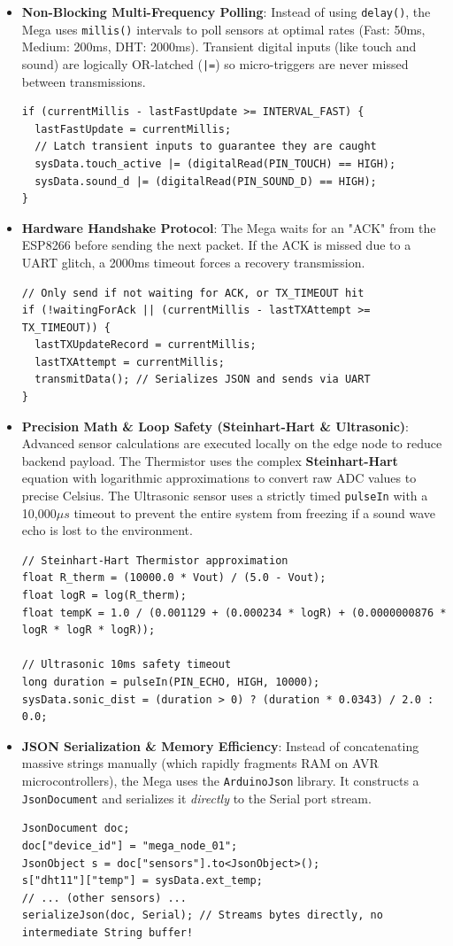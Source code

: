 \documentclass[12pt,a4paper]{article}
\newcommand{\keyword}[1]{\textcolor{keywordcolor}{\textbf{#1}}}
\newcommand{\Q}[1]{\textcolor{questioncolor}{\textbf{#1}}}
\begin{document}
\begin{itemize}
    \item \Q{Non-Blocking Multi-Frequency Polling}:
    Instead of using \texttt{delay()}, the Mega uses \texttt{millis()} intervals to poll sensors at optimal rates (Fast: 50ms, Medium: 200ms, DHT: 2000ms). Transient digital inputs (like touch and sound) are logically OR-latched (\texttt{|=}) so micro-triggers are never missed between transmissions.
\begin{verbatim}
if (currentMillis - lastFastUpdate >= INTERVAL_FAST) {
  lastFastUpdate = currentMillis;
  // Latch transient inputs to guarantee they are caught
  sysData.touch_active |= (digitalRead(PIN_TOUCH) == HIGH);
  sysData.sound_d |= (digitalRead(PIN_SOUND_D) == HIGH);
}
\end{verbatim}

    \item \Q{Hardware Handshake Protocol}:
    The Mega waits for an "ACK" from the ESP8266 before sending the next packet. If the ACK is missed due to a UART glitch, a 2000ms timeout forces a recovery transmission.
\begin{verbatim}
// Only send if not waiting for ACK, or TX_TIMEOUT hit
if (!waitingForAck || (currentMillis - lastTXAttempt >= TX_TIMEOUT)) {
  lastTXUpdateRecord = currentMillis;
  lastTXAttempt = currentMillis;
  transmitData(); // Serializes JSON and sends via UART
}
\end{verbatim}

    \item \Q{Precision Math \& Loop Safety (\keyword{Steinhart-Hart} \& Ultrasonic)}:
    Advanced sensor calculations are executed locally on the edge node to reduce backend payload. The Thermistor uses the complex \keyword{Steinhart-Hart} equation with logarithmic approximations to convert raw ADC values to precise Celsius. The Ultrasonic sensor uses a strictly timed \texttt{pulseIn} with a 10,000$\mu s$ timeout to prevent the entire system from freezing if a sound wave echo is lost to the environment.
\begin{verbatim}
// Steinhart-Hart Thermistor approximation
float R_therm = (10000.0 * Vout) / (5.0 - Vout);
float logR = log(R_therm);
float tempK = 1.0 / (0.001129 + (0.000234 * logR) + (0.0000000876 * logR * logR * logR));

// Ultrasonic 10ms safety timeout
long duration = pulseIn(PIN_ECHO, HIGH, 10000); 
sysData.sonic_dist = (duration > 0) ? (duration * 0.0343) / 2.0 : 0.0;
\end{verbatim}
    \item \Q{JSON Serialization \& Memory Efficiency}:
    Instead of concatenating massive strings manually (which rapidly fragments RAM on AVR microcontrollers), the Mega uses the \texttt{ArduinoJson} library. It constructs a \texttt{JsonDocument} and serializes it \textit{directly} to the Serial port stream.
\begin{verbatim}
JsonDocument doc;
doc["device_id"] = "mega_node_01";
JsonObject s = doc["sensors"].to<JsonObject>();
s["dht11"]["temp"] = sysData.ext_temp;
// ... (other sensors) ...
serializeJson(doc, Serial); // Streams bytes directly, no intermediate String buffer!
\end{verbatim}


\end{itemize}
\end{document}
